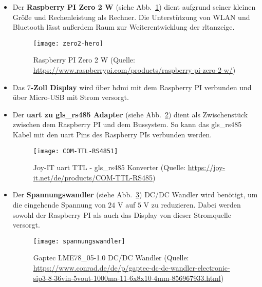 \begin{itemize}
    \item Der \textbf{Raspberry PI Zero 2 W} (siehe Abb.~\ref{fig:zero_2_w}) dient aufgrund seiner kleinen Größe und Rechenleistung als Rechner. Die Unterstützung von WLAN und Bluetooth lässt außerdem Raum zur Weiterentwicklung der \ac{rltanzeige}.
    \begin{figure}[H]
        \centering
        \texttt{[image: zero2-hero]}
        \caption{Raspberry PI Zero 2 W (Quelle: \url{https://www.raspberrypi.com/products/raspberry-pi-zero-2-w/}) \label{fig:zero_2_w}}
    \end{figure}
    
    \item Das \textbf{$7$-Zoll Display} wird über \ac{hdmi} mit dem Raspberry PI verbunden und über Micro-USB mit Strom versorgt.

    \item Der \textbf{\ac{uart} zu \gls{gls_rs485} Adapter} (siehe Abb.~\ref{fig:ttl_rs485_adapter}) dient als Zwischenstück zwischen dem Raspberry PI und dem Bussystem. So kann das \gls{gls_rs485} Kabel mit den \ac{uart} Pins des Raspberry PIs verbunden werden.
    \begin{figure}[H]
        \centering
        \texttt{[image: COM-TTL-RS4851]}
        \caption{Joy-IT \ac{uart} TTL - \gls{gls_rs485} Konverter (Quelle: \url{https://joy-it.net/de/products/COM-TTL-RS485}) \label{fig:ttl_rs485_adapter}}
    \end{figure}

    \item Der \textbf{Spannungswandler} (siehe Abb.~\ref{fig:spannungswandler}) \bzw DC/DC Wandler wird benötigt, um die eingehende Spannung von $24$ V auf $5$ V zu reduzieren. Dabei werden sowohl der Raspberry PI als auch das Display von dieser Stromquelle versorgt.
    \begin{figure}[H]
        \centering
        \texttt{[image: spannungswandler]}
        \caption{Gaptec LME78\_05-1.0 DC/DC Wandler (Quelle: \url{https://www.conrad.de/de/p/gaptec-dc-dc-wandler-electronic-sip3-8-36vin-5vout-1000ma-11-6x8x10-4mm-856967933.html}) \label{fig:spannungswandler}}
    \end{figure}
\end{itemize}